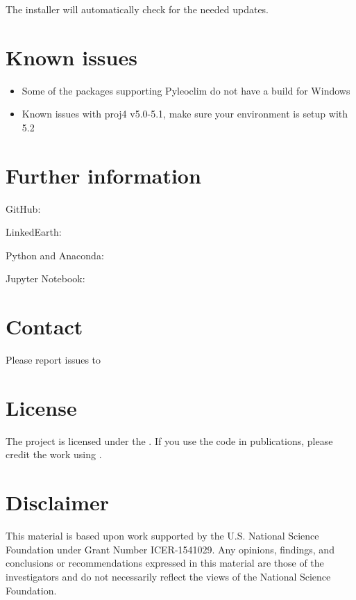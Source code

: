 \documentclass[letterpaper,10pt,english]{sphinxmanual}
\begin{document}
The installer will automatically check for the needed updates.


\section{Known issues}
\label{\detokenize{Introduction:known-issues}}\begin{itemize}
\item {} 
Some of the packages supporting Pyleoclim do not have a build for Windows

\item {} 
Known issues with proj4 v5.0-5.1, make sure your environment is setup with 5.2

\end{itemize}


\section{Further information}
\label{\detokenize{Introduction:further-information}}
\begin{DUlineblock}{0em}
\item[] GitHub: 
\item[] LinkedEarth: 
\item[] Python and Anaconda: 
\item[] Jupyter Notebook: 
\end{DUlineblock}


\section{Contact}
\label{\detokenize{Introduction:contact}}
Please report issues to 


\section{License}
\label{\detokenize{Introduction:license}}
The project is licensed under the  .
If you use the code in publications, please credit the work using .


\section{Disclaimer}
\label{\detokenize{Introduction:disclaimer}}
This material is based upon work supported by the U.S. National Science Foundation under Grant Number
ICER-1541029. Any opinions, findings, and conclusions or recommendations expressed in this material are those
of the investigators and do not necessarily reflect the views of the National Science Foundation.
\end{document}
